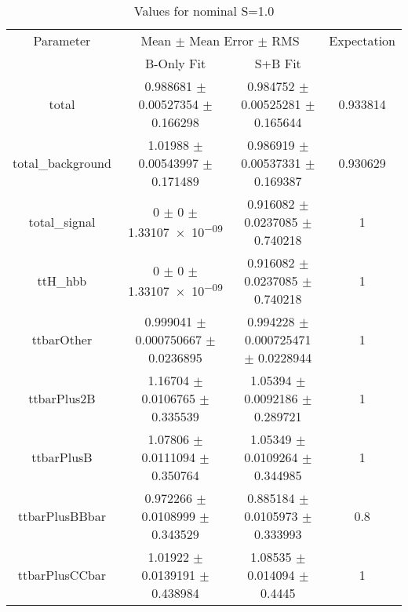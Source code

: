 \begin{table}
\centering
\caption{Values for nominal S=1.0}
\begin{tabular}{cccc}
\toprule
Parameter & \multicolumn{2}{c}{Mean $\pm$ Mean Error $\pm$ RMS} & Expectation\\
 & B-Only Fit & S+B Fit & \\
\midrule
total & \num{0.988681} $\pm$ \num{0.00527354} $\pm$ \num{0.166298} & \num{0.984752} $\pm$ \num{0.00525281} $\pm$ \num{0.165644} & \num{0.933814}\\
total\_background & \num{1.01988} $\pm$ \num{0.00543997} $\pm$ \num{0.171489} & \num{0.986919} $\pm$ \num{0.00537331} $\pm$ \num{0.169387} & \num{0.930629}\\
total\_signal & \num{0} $\pm$ \num{0} $\pm$ \num{1.33107e-09} & \num{0.916082} $\pm$ \num{0.0237085} $\pm$ \num{0.740218} & \num{1}\\
ttH\_hbb & \num{0} $\pm$ \num{0} $\pm$ \num{1.33107e-09} & \num{0.916082} $\pm$ \num{0.0237085} $\pm$ \num{0.740218} & \num{1}\\
ttbarOther & \num{0.999041} $\pm$ \num{0.000750667} $\pm$ \num{0.0236895} & \num{0.994228} $\pm$ \num{0.000725471} $\pm$ \num{0.0228944} & \num{1}\\
ttbarPlus2B & \num{1.16704} $\pm$ \num{0.0106765} $\pm$ \num{0.335539} & \num{1.05394} $\pm$ \num{0.0092186} $\pm$ \num{0.289721} & \num{1}\\
ttbarPlusB & \num{1.07806} $\pm$ \num{0.0111094} $\pm$ \num{0.350764} & \num{1.05349} $\pm$ \num{0.0109264} $\pm$ \num{0.344985} & \num{1}\\
ttbarPlusBBbar & \num{0.972266} $\pm$ \num{0.0108999} $\pm$ \num{0.343529} & \num{0.885184} $\pm$ \num{0.0105973} $\pm$ \num{0.333993} & \num{0.8}\\
ttbarPlusCCbar & \num{1.01922} $\pm$ \num{0.0139191} $\pm$ \num{0.438984} & \num{1.08535} $\pm$ \num{0.014094} $\pm$ \num{0.4445} & \num{1}\\
\bottomrule
\end{tabular}
\end{table}